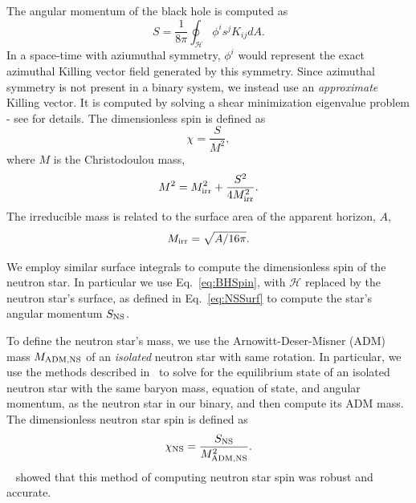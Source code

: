 The angular momentum of the black hole is
computed as~\citep{Lovelace2008,FoucartEtAl:2008}
\begin{equation}
\label{eq:BHSpin}
S=\frac{1}{8\pi}\oint_{\mathcal{H}}\phi^is^jK_{ij}dA.
\end{equation}
 In a space-time with aziumuthal symmetry, $\phi^i$ would represent
 the exact azimuthal Killing vector field generated by this symmetry.
Since azimuthal symmetry is not present in a binary system, we
instead use an {\it approximate} Killing vector. It is computed by solving a
shear minimization eigenvalue problem - see
\cite{Cook2007,Lovelace2008}  for details. The dimensionless spin is defined as
\begin{equation}
\label{eq:ChiDef}
\chi=\frac{S}{M^2},
\end{equation}
where $M$ is the Christodoulou mass,
\begin{equation}
M^2=M_{\rm irr}^2+\frac{S^2}{4M_{\rm irr}^2}.
\end{equation}
The irreducible mass is related to the surface area of the apparent horizon, $A$,
\begin{equation}\label{eq:Mirr}
M_{\rm irr}=\sqrt{A/16\pi}.
\end{equation}


We employ similar surface integrals to compute the dimensionless spin
of the neutron star. In particular we use Eq.~\ref{eq:BHSpin}, with
$\mathcal{H}$ replaced by the neutron star's surface, as defined in
Eq.~\ref{eq:NSSurf} to compute the star's angular momentum
$S_{\rm NS}$.

To define the neutron star's mass, we use the Arnowitt-Deser-Misner
(ADM) mass $M_{\rm ADM, NS}$ of an {\it isolated} neutron star with
same rotation. In particular, we use the methods described
in~\cite{cook94a} to solve for the equilibrium state of an
isolated neutron star with the same baryon mass, equation of state,
and angular momentum, as the neutron star in our binary, and then
compute its ADM mass. The dimensionless neutron star spin is 
defined as
\begin{equation}
  \chi_{\rm NS}=\frac{S_{\rm NS}}{M_{\rm ADM, NS}^2}.
\end{equation}
~\cite{Tacik:2015tja} showed that this method of computing
neutron star spin was robust and accurate.


